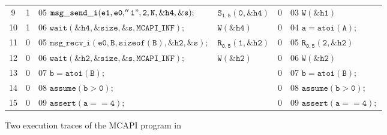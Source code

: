 \begin{figure*}
\begin{center}
\begin{tabular}[t]{|c|c|l|l||c|l|}
9 & 1 & 05 $\mathtt{msg\_send\_i(e1,e0,''1",2,N,\&h4,\&s);}$ & $\mathtt{S_{1,5}(0,\&h4)}$ & 0 & 03 $\mathtt{W(\&h1)}$ \\
10 & 1 & 06 $\mathtt{wait(\&h4,\&size,\&s,MCAPI\_INF);}$ & $\mathtt{W(\&h4)}$ & 0 & 04 $\mathtt{a = atoi(A);}$ \\
11 & 0 & 05 $\mathtt{msg\_recv\_i(e0,B,sizeof(B),\&h2,\&s);}$ & $\mathtt{R_{0,5}(1,\&h2)}$ & 0 & 05 $\mathtt{R_{0,5}(2,\&h2)}$\\
12 & 0 & 06 $\mathtt{wait(\&h2,\&size,\&s,MCAPI\_INF);}$ & $\mathtt{W(\&h2)}$ & 0 & 06 $\mathtt{W(\&h2)}$ \\
13 & 0 & 07 $\mathtt{b = atoi(B);}$ & & 0 & 07 $\mathtt{b = atoi(B);}$ \\
14 & 0 & 08 $\mathtt{assume (b > 0);}$ & & 0 & 08 $\mathtt{assume (b > 0);}$ \\
15 & 0 & 09 $\mathtt{assert(a == 4);}$ & & 0 & 09 $\mathtt{assert(a == 4);}$ \\
\hline
\end{tabular}
\end{center}
\caption{Two execution traces of the MCAPI program in }
\label{fig:trace}
\end{figure*}



